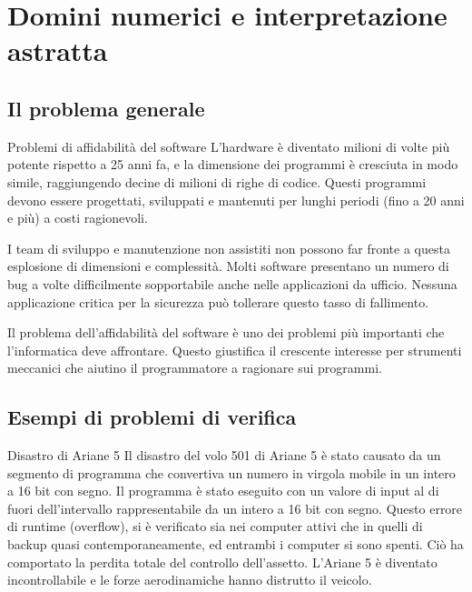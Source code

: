 \section{Domini numerici e interpretazione astratta}

\subsection{Il problema generale}

\begin{nota}{Problemi di affidabilità del software}{}
L'hardware è diventato milioni di volte più potente rispetto a 25 anni fa, e
la dimensione dei programmi è cresciuta in modo simile, raggiungendo decine
di milioni di righe di codice.
Questi programmi devono essere progettati, sviluppati e mantenuti per lunghi
periodi (fino a 20 anni e più) a costi ragionevoli.

I team di sviluppo e manutenzione non assistiti non possono far fronte a
questa esplosione di dimensioni e complessità. Molti software presentano un
numero di bug a volte difficilmente sopportabile anche nelle applicazioni da
ufficio.
Nessuna applicazione critica per la sicurezza può tollerare questo tasso di
fallimento.

Il problema dell'affidabilità del software è uno dei problemi più importanti
che l'informatica deve affrontare.
Questo giustifica il crescente interesse per strumenti meccanici che aiutino
il programmatore a ragionare sui programmi.
\end{nota}

\subsection{Esempi di problemi di verifica}

\begin{esempio}{Disastro di Ariane 5}{}
Il disastro del volo 501 di Ariane 5 è stato causato da un segmento di
programma che convertiva un numero in virgola mobile in un intero a 16 bit
con segno.
Il programma è stato eseguito con un valore di input al di fuori
dell'intervallo rappresentabile da un intero a 16 bit con segno.
Questo errore di runtime (overflow), si è verificato sia nei computer attivi
che in quelli di backup quasi contemporaneamente, ed entrambi i computer si
sono spenti.
Ciò ha comportato la perdita totale del controllo dell'assetto. L'Ariane 5
è diventato incontrollabile e le forze aerodinamiche hanno distrutto il
veicolo.
\end{esempio}


